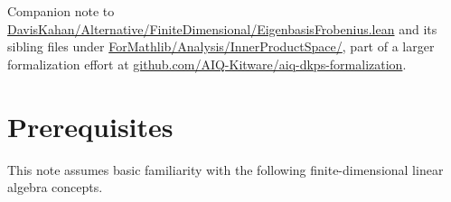 \documentclass[11pt]{article}
\theoremstyle{remark}
\begin{document}
\vspace{1.5em}
\noindent Companion note to \href{https://github.com/AIQ-Kitware/aiq-dkps-formalization/blob/82d20de0546c5414317df8bcffb4229fb72f8d89/DavisKahan/Alternative/FiniteDimensional/EigenbasisFrobenius.lean}{DavisKahan/Alternative/FiniteDimensional/EigenbasisFrobenius.lean} and its sibling files under \href{https://github.com/AIQ-Kitware/aiq-dkps-formalization/tree/82d20de0546c5414317df8bcffb4229fb72f8d89/ForMathlib/Analysis/InnerProductSpace}{ForMathlib/Analysis/InnerProductSpace/}, part of a larger formalization effort at \href{https://github.com/AIQ-Kitware/aiq-dkps-formalization}{github.com/AIQ-Kitware/aiq-dkps-formalization}.



\section{Prerequisites}

This note assumes basic familiarity with the following finite-dimensional linear
algebra concepts.
\end{document}
